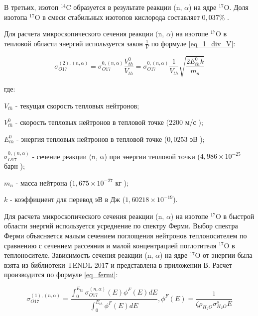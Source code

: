 В третьих, изотоп $^{14}\text{C}$ образуется в результате реакции (n, $\alpha$) на ядре $^{17}\text{O}$. Доля изотопа 
$^{17}\text{O}$ в смеси стабильных изотопов кислорода составляет $0,037 \%$ \cite{hoefs_oxygen_isotopes}.

Для расчета микроскопического сечения реакции (n, $\alpha$) на изотопе $^{17}\text{O}$ в тепловой области энергий 
используется закон $\frac{1}{V}$ по формуле \ref{eq_1_div_V}:

\begin{equation}
    \label{eq_1_div_V}
    \sigma_{O17}^{(2), (n, \alpha)} = \sigma_{O17}^{0, (n, \alpha)} \frac{V_{th}^0}{V_{th}} = 
        \sigma_{O17}^{0, (n, \alpha)} \frac{1}{V_{th}} \sqrt{\frac{2 E_{th}^{0} k}{m_{n}}}
\end{equation}

где:
\begin{description}
    \item ${V_{th}}$ - текущая скорость тепловых нейтронов;
    \item ${V_{th}^{0}}$ - скорость тепловых нейтронов в тепловой точке ($2200$ м/с \cite{kruchkov_tpn});
    \item $E_{th}^{0}$ - энергия тепловых нейтронов в тепловой точке ($0,0253$ эВ \cite{kruchkov_tpn});
    \item $\sigma_{O17}^{0, (n, \alpha)}$ - сечение реакции (n, $\alpha$) при энергии тепловой точки ($4,986 \times 
        10^{-25}$ барн \cite{janis});
    \item $m_{n}$ - масса нейтрона ($1,675 \times 10^{-27}$ кг \cite{kruchkov_tpn});
    \item $k$ - коэффициент для перевод эВ в Дж ($1,60218 \times 10^{-19}$).
\end{description}

Для расчета микроскопического сечения реакции (n, $\alpha$) на изотопе $^{17}\text{O}$ в быстрой области энергий 
используется усреднение по спектру Ферми. Выбор спектра Ферми объясняется малым сечением поглощения нейтронов 
теплоносителем по сравнению с сечением рассеяния и малой концентрацией поглотителя $^{17}\text{O}$ в теплоносителе. 
Зависимость сечения реакции (n, $\alpha$) на ядре $^{17}\text{O}$ от энергии была взята из библиотеки TENDL-2017 
\cite{janis} и представлена в приложении В. Расчет производится по формуле \ref{eq_fermi}:

\begin{equation}
    \label{eq_fermi}
    \sigma_{O17}^{(1), (n, \alpha)} = \frac
        {\int_{0}^{E_{th}} \sigma_{O17}^{(n, \alpha)}(E) \phi^{F}(E) dE}
        {\int_{0}^{E_{th}} \phi^{F}(E) dE}, \phi^{F}(E) = \frac{1}{\zeta \rho_{H_2O} \sigma_{H_2O}^s E}
\end{equation}

